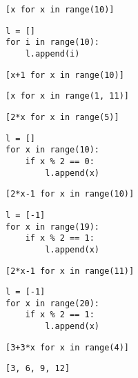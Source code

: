 \documentclass[12pt,a4paper]{article}
\begin{document}
\pagestyle{empty}
\noindent

\begin{multicols}{2}

\begin{lstlisting}
[x for x in range(10)]
\end{lstlisting}

\begin{lstlisting}
l = []
for i in range(10):
    l.append(i)
\end{lstlisting}


\begin{lstlisting}
[x+1 for x in range(10)]
\end{lstlisting}

\begin{lstlisting}
[x for x in range(1, 11)]
\end{lstlisting}


\begin{lstlisting}
[2*x for x in range(5)]
\end{lstlisting}

\begin{lstlisting}
l = []
for x in range(10):
    if x % 2 == 0:
        l.append(x)
\end{lstlisting}


\begin{lstlisting}
[2*x-1 for x in range(10)]
\end{lstlisting}

\begin{lstlisting}
l = [-1]
for x in range(19):
    if x % 2 == 1:
        l.append(x)
\end{lstlisting}


\begin{lstlisting}
[2*x-1 for x in range(11)]
\end{lstlisting}

\begin{lstlisting}
l = [-1]
for x in range(20):
    if x % 2 == 1:
        l.append(x)
\end{lstlisting}


\begin{lstlisting}
[3+3*x for x in range(4)]
\end{lstlisting}

\begin{lstlisting}
[3, 6, 9, 12]
\end{lstlisting}


\end{multicols}
\end{document}
